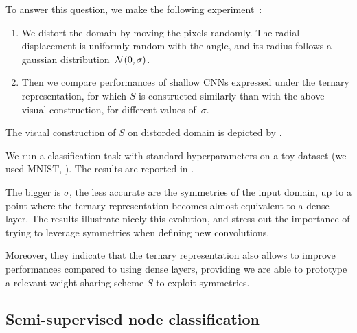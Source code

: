To answer this question, we make the following experiment~\citep{vialatte2016generalizing}:
\begin{enumerate}
\item We distort the domain by moving the pixels randomly. The radial displacement is uniformly random with the angle, and its radius follows a gaussian distribution~$\mathcal{N}(0,\sigma)$.
\item Then we compare performances of shallow CNNs expressed under the ternary representation, for which $S$ is constructed similarly than with the above visual construction, for different values of~$\sigma$.
\end{enumerate}

The visual construction of $S$ on distorded domain is depicted by .



We run a classification task with standard hyperparameters on a toy dataset (we used MNIST, \cite{lecun1998mnist}). The results are reported in .



The bigger is $\sigma$, the less accurate are the symmetries of the input domain, up to a point where the ternary representation becomes almost equivalent to a dense layer. The results illustrate nicely this evolution, and stress out the importance of trying to leverage symmetries when defining new convolutions.

Moreover, they indicate that the ternary representation also allows to improve performances compared to using dense layers, providing we are able to prototype a relevant weight sharing scheme $S$ to exploit symmetries.



\subsection{Semi-supervised node classification}


